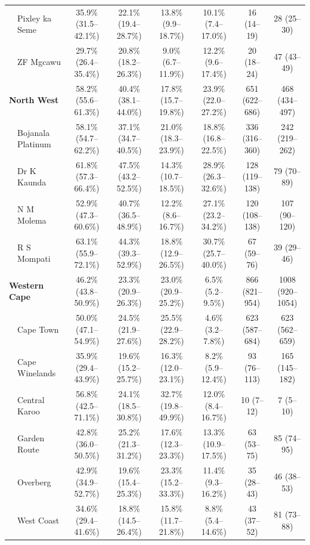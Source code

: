 \documentclass{article}
\begin{document}
\begin{landscape}
{\begin{longtable}[c]{llc cc ccc}
      & Pixley ka Seme & 35.9\% (31.5--42.1\%) & 22.1\% (19.4--28.7\%) & 13.8\% (9.9--18.7\%) & 10.1\% (7.4--17.0\%) & 16 (14--19) & 28 (25--30) \\
      & ZF Mgcawu & 29.7\% (26.4--35.4\%) & 20.8\% (18.2--26.3\%) & 9.0\% (6.7--11.9\%) & 12.2\% (9.6--17.4\%) & 20 (18--24) & 47 (43--49) \\[5pt]
      \multicolumn{2}{l}{\textbf{North West}} & 58.2\% (55.6--61.3\%) & 40.4\% (38.1--44.0\%) & 17.8\% (15.7--19.8\%) & 23.9\% (22.0--27.2\%) & 651 (622--686) & 468 (434--497) \\
      & Bojanala Platinum & 58.1\% (54.7--62.2\%) & 37.1\% (34.7--40.5\%) & 21.0\% (18.3--23.9\%) & 18.8\% (16.8--22.5\%) & 336 (316--360) & 242 (219--262) \\
      & Dr K Kaunda & 61.8\% (57.3--66.4\%) & 47.5\% (43.2--52.5\%) & 14.3\% (10.7--18.5\%) & 28.9\% (26.3--32.6\%) & 128 (119--138) & 79 (70--89) \\
      & N M Molema & 52.9\% (47.3--60.6\%) & 40.7\% (36.5--48.9\%) & 12.2\% (8.6--16.7\%) & 27.1\% (23.2--34.2\%) & 120 (108--138) & 107 (90--120) \\
      & R S Mompati & 63.1\% (55.9--72.1\%) & 44.3\% (39.3--52.9\%) & 18.8\% (12.9--26.5\%) & 30.7\% (25.7--40.0\%) & 67 (59--76) & 39 (29--46) \\[5pt]
      \multicolumn{2}{l}{\textbf{Western Cape}} & 46.2\% (43.8--50.9\%) & 23.3\% (20.9--26.3\%) & 23.0\% (20.9--25.2\%) & 6.5\% (5.2--9.5\%) & 866 (821--954) & 1008 (920--1054) \\
      & Cape Town & 50.0\% (47.1--54.9\%) & 24.5\% (21.9--27.6\%) & 25.5\% (22.9--28.2\%) & 4.6\% (3.2--7.8\%) & 623 (587--684) & 623 (562--659) \\
      & Cape Winelands & 35.9\% (29.4--43.9\%) & 19.6\% (15.2--25.7\%) & 16.3\% (12.0--23.1\%) & 8.2\% (5.9--12.4\%) & 93 (76--113) & 165 (145--182) \\
      & Central Karoo & 56.8\% (42.5--71.1\%) & 24.1\% (18.5--30.8\%) & 32.7\% (19.8--49.9\%) & 12.0\% (8.4--16.7\%) & 10 (7--12) & 7 (5--10) \\
      & Garden Route & 42.8\% (36.0--50.5\%) & 25.2\% (21.3--31.2\%) & 17.6\% (12.3--23.3\%) & 13.3\% (10.9--17.5\%) & 63 (53--75) & 85 (74--95) \\
      & Overberg & 42.9\% (34.9--52.7\%) & 19.6\% (15.4--25.3\%) & 23.3\% (15.2--33.3\%) & 11.4\% (9.3--16.2\%) & 35 (28--43) & 46 (38--53) \\
      & West Coast & 34.6\% (29.4--41.6\%) & 18.8\% (14.5--26.4\%) & 15.8\% (11.7--21.8\%) & 8.8\% (5.4--14.6\%) & 43 (37--52) & 81 (73--88) 
      \label{tab:results}
  \end{longtable}
  }
\end{landscape}

\end{document}
